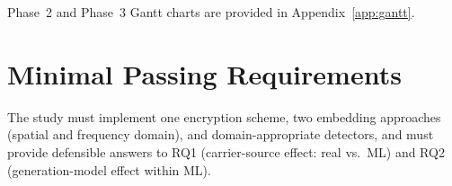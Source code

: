 \documentclass[10pt,twocolumn,a4paper]{article}
\begin{document}
Phase~2 and Phase~3 Gantt charts are provided in Appendix~\ref{app:gantt}.

\section{Minimal Passing Requirements}

The study must implement one encryption scheme, two embedding approaches (spatial and frequency domain), and domain-appropriate detectors, and must provide defensible answers to RQ1 (carrier-source effect: real vs.\ ML) and RQ2 (generation-model effect within ML).

\clearpage
\renewcommand{\refname}{References}
\end{document}
